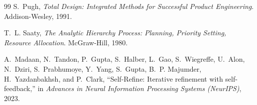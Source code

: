 \documentclass[11pt,a4paper]{article}
\begin{document}
\begin{thebibliography}{99}
S.~Pugh, \emph{Total Design: Integrated Methods for Successful Product Engineering}. Addison-Wesley, 1991.

T.~L. Saaty, \emph{The Analytic Hierarchy Process: Planning, Priority Setting, Resource Allocation}. McGraw-Hill, 1980.

A.~Madaan, N.~Tandon, P.~Gupta, S.~Halber, L.~Gao, S.~Wiegreffe, U.~Alon, N.~Dziri, S.~Prabhumoye, Y.~Yang, S.~Gupta, B.~P. Majumder, H.~Yazdanbakhsh, and P.~Clark, ``Self-Refine: Iterative refinement with self-feedback,'' in \emph{Advances in Neural Information Processing Systems (NeurIPS)}, 2023.

\end{thebibliography}
\end{document}
